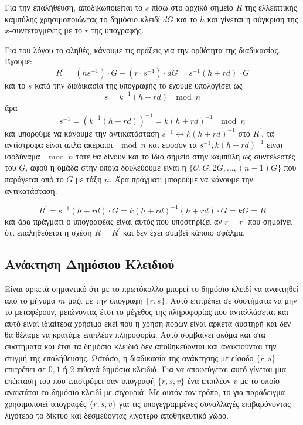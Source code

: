 \documentclass[oneside,a4paper]{article}
\begin{document}
Για την επαλήθευση, αποδικωποιείται το $s$ πίσω στο αρχικό σημείο $R$ της ελλειπτικής καμπύλης χρησιμοποιώντας το δημόσιο κλειδί $dG$ και το  $h$ και γίνεται η σύγκριση της $x$-συντεταγμένης με το $r$ της υπογραφής.

Για του λόγου το αληθές, κάνουμε τις πράξεις για την ορθότητα της διαδικασίας. Έχουμε:
$$R^{\prime} = (h s^{-1})\cdot G + (r\cdot s^{-1})\cdot dG = s^{-1}(h+rd)\cdot G$$
και το $s$ κατά την διαδικασία της υπογραφής το έχουμε υπολογίσει ως
$$s = k^{-1}(h+rd) \ \mod n$$ άρα
$$s^{-1} = (k^{-1}(h+rd))^{-1} = k(h+rd)^{-1} \ \mod n$$ και μπορούμε να κάνουμε την αντικατάσταση $s^{-1} \leftrightarrow k(h+rd)^{-1}$ στο $R^{\prime}$, τα αντίστροφα είναι απλά ακέραιοι $\mod n$ και εφόσον τα $s^{-1}, k(h+rd)^{-1}$ είναι ισοδύναμα $\mod n$ τότε θα δίνουν και το ίδιο σημείο στην καμπύλη ως συντελεστές του $G$, αφού η ομάδα στην οποία δουλεύουμε είναι η $\{\mathcal{O},G,2G,\ldots,(n-1)G\}$ που παράγεται από το $G$ με τάξη $n$. Άρα πράγματι μπορούμε να κάνουμε την αντικατάσταση:

$$R^{\prime} = s^{-1}(h+rd) \cdot G = k(h+rd)^{-1}(h+rd) \cdot G = kG = R$$ και άρα πράγματι ο υπογραφέας είναι αυτός που υποστηρίζει αν $r=r^{\prime}$ που σημαίνει ότι επαληθεύεται η σχέση $R=R^{\prime}$ και δεν έχει συμβεί κάποιο σφάλμα.

\subsection{Ανάκτηση Δημόσιου Κλειδιού}

Είναι αρκετά σημαντικό ότι με το πρωτόκολλο  μπορεί το δημόσιο κλειδί να ανακτηθεί από το μήνυμα $m$ μαζί με την υπογραφή $\{r,s\}$. Αυτό επιτρέπει σε συστήματα να μην το μεταφέρουν, μειώνοντας έτσι το μέγεθος της πληροφορίας που ανταλλάσεται και αυτό είναι ιδιαίτερα χρήσιμο εκεί που η χρήση πόρων είναι αρκετά αυστηρή και δεν θα θέλαμε να κρατάμε επιπλέον πληροφορία. Αυτό συμβαίνει ακόμα και στα  συστήματα και έτσι τα δημόσια κλειδιά δεν αποθηκεύονται και ανακτούνται την στιγμή της επαλήθευσης. Ωστόσο, η διαδικασία της ανάκτησης με είσοδο $\{r,s\}$ επιτρέπει σε $0,1$ ή $2$ πιθανά δημόσια κλειδιά. Για να αποφεύγεται αυτό γίνεται μια επέκταση του  που επιστρέφει σαν υπογραφή $\{r,s,v\}$ ένα επιπλέον  $v$ με το οποίο ανακτάται το δημόσιο κλειδί με σιγουριά. Με αυτόν τον τρόπο, το  για παράδειγμα χρησιμοποιεί υπογραφές $\{r,s,v\}$ για τις υπογεγραμμένες συναλλαγές επιβαρύνοντας λιγότερο το δίκτυο και δεσμεύοντας λιγότερο αποθηκευτικό χώρο. 
\end{document}
